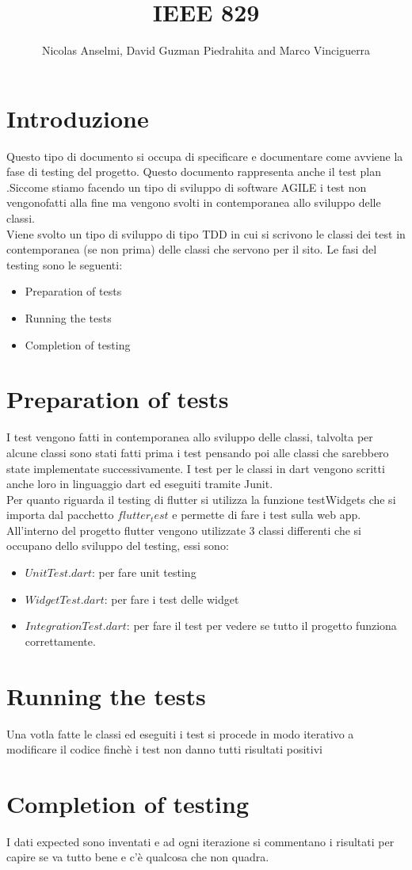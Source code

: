 \documentclass{article}
\title{IEEE 829}
\author{Nicolas Anselmi, David Guzman Piedrahita and Marco Vinciguerra}
\begin{document}
\maketitle
\section{Introduzione}
Questo tipo di documento si occupa di specificare e documentare come avviene la fase di testing
del progetto. Questo documento rappresenta anche il test plan .Siccome stiamo facendo un tipo di
sviluppo di software AGILE i test non vengonofatti alla fine ma vengono svolti in contemporanea allo
sviluppo delle classi.
\\Viene svolto un tipo di sviluppo di tipo TDD in cui si scrivono le classi dei test in 
contemporanea (se non prima) delle classi che servono per il sito. Le fasi del testing sono le 
seguenti:
\begin{itemize}
    \item Preparation of tests 
    \item Running the  tests
    \item Completion of testing
\end{itemize}

\section{Preparation of tests}
I test vengono fatti in contemporanea allo sviluppo delle classi, talvolta per alcune classi
sono stati fatti prima i test pensando poi alle classi che sarebbero state implementate successivamente.
I test per le classi in dart vengono scritti anche loro in linguaggio dart ed eseguiti tramite Junit.
\\Per quanto riguarda il testing di flutter si utilizza la funzione testWidgets che si importa 
dal pacchetto $flutter_test$ e permette di fare i test sulla web app.
\\All'interno del progetto flutter vengono utilizzate 3 classi differenti che si occupano dello 
sviluppo del testing, essi sono:
\begin{itemize}
    \item $UnitTest.dart$: per fare unit testing
    \item $WidgetTest.dart$: per fare i test delle widget
    \item $IntegrationTest.dart$: per fare il test per vedere
        se tutto il progetto funziona correttamente.
\end{itemize}

\section{Running the tests}
Una votla fatte le classi ed eseguiti i test si procede in modo iterativo a modificare il codice
finchè i test non danno tutti risultati positivi

\section{Completion of testing}
I dati expected sono inventati e ad ogni iterazione si commentano i risultati per capire 
se va tutto bene e c'è qualcosa che non  quadra.
\end{document}
